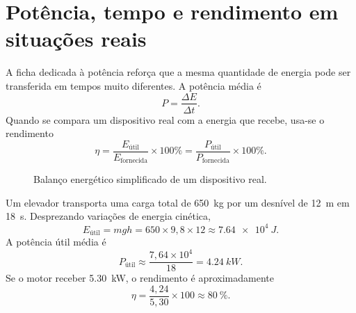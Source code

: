 \documentclass[11pt,a4paper,oneside]{book}
\begin{document}
\section{Potência, tempo e rendimento em situações reais}
A ficha dedicada à potência reforça que a mesma quantidade de energia pode ser transferida em tempos muito diferentes. A potência média é
\[
P=\frac{\Delta E}{\Delta t}.
\]
Quando se compara um dispositivo real com a energia que recebe, usa-se o rendimento
\[
\eta=\frac{E_{\text{útil}}}{E_{\text{fornecida}}}\times100\%
=\frac{P_{\text{útil}}}{P_{\text{fornecida}}}\times100\%.
\]

\begin{figure}[H]
\centering
{}
\caption{Balanço energético simplificado de um dispositivo real.}
\end{figure}

\begin{exemplo}[title=Exemplo resolvido -- elevador e potência]
Um elevador transporta uma carga total de \SI{650}{kg} por um desnível de \SI{12}{m} em \SI{18}{s}. Desprezando variações de energia cinética,
\[
E_{\text{útil}}=mgh=650\times9{,}8\times12\approx\SI{7.64e4}{J}.
\]
A potência útil média é
\[
P_{\text{útil}}\approx\frac{7{,}64\times10^4}{18}=\SI{4.24}{kW}.
\]
Se o motor receber \SI{5.30}{kW}, o rendimento é aproximadamente
\[
\eta=\frac{4{,}24}{5{,}30}\times100\approx\SI{80}{\percent}.
\]
\end{exemplo}
\end{document}
